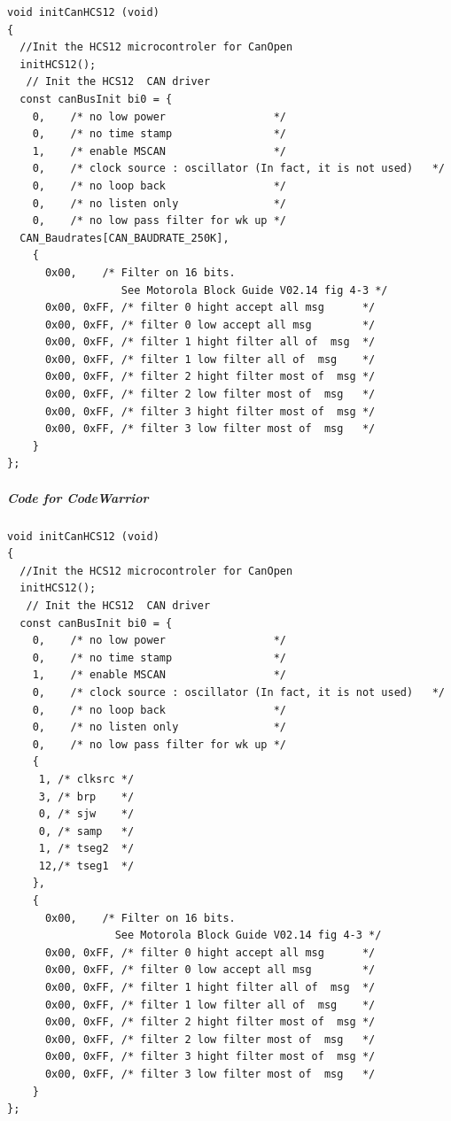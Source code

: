 \documentclass[12pt,english,a4paper]{book}
\begin{document}
\begin{verbatim}
void initCanHCS12 (void)
{  
  //Init the HCS12 microcontroler for CanOpen 
  initHCS12();
   // Init the HCS12  CAN driver
  const canBusInit bi0 = {
    0,    /* no low power                 */ 
    0,    /* no time stamp                */
    1,    /* enable MSCAN                 */
    0,    /* clock source : oscillator (In fact, it is not used)   */
    0,    /* no loop back                 */
    0,    /* no listen only               */
    0,    /* no low pass filter for wk up */
  CAN_Baudrates[CAN_BAUDRATE_250K],
    {
      0x00,    /* Filter on 16 bits.
                  See Motorola Block Guide V02.14 fig 4-3 */
      0x00, 0xFF, /* filter 0 hight accept all msg      */
      0x00, 0xFF, /* filter 0 low accept all msg        */
      0x00, 0xFF, /* filter 1 hight filter all of  msg  */
      0x00, 0xFF, /* filter 1 low filter all of  msg    */
      0x00, 0xFF, /* filter 2 hight filter most of  msg */
      0x00, 0xFF, /* filter 2 low filter most of  msg   */
      0x00, 0xFF, /* filter 3 hight filter most of  msg */
      0x00, 0xFF, /* filter 3 low filter most of  msg   */
    }
};
\end{verbatim}


\subparagraph{Code for CodeWarrior
}


\begin{verbatim}
void initCanHCS12 (void)
{  
  //Init the HCS12 microcontroler for CanOpen 
  initHCS12();
   // Init the HCS12  CAN driver
  const canBusInit bi0 = {
    0,    /* no low power                 */ 
    0,    /* no time stamp                */
    1,    /* enable MSCAN                 */
    0,    /* clock source : oscillator (In fact, it is not used)   */
    0,    /* no loop back                 */
    0,    /* no listen only               */
    0,    /* no low pass filter for wk up */
    {
     1, /* clksrc */
     3, /* brp    */
     0, /* sjw    */
     0, /* samp   */
     1, /* tseg2  */
     12,/* tseg1  */
    },
    {
      0x00,    /* Filter on 16 bits.
                 See Motorola Block Guide V02.14 fig 4-3 */
      0x00, 0xFF, /* filter 0 hight accept all msg      */
      0x00, 0xFF, /* filter 0 low accept all msg        */
      0x00, 0xFF, /* filter 1 hight filter all of  msg  */
      0x00, 0xFF, /* filter 1 low filter all of  msg    */
      0x00, 0xFF, /* filter 2 hight filter most of  msg */
      0x00, 0xFF, /* filter 2 low filter most of  msg   */
      0x00, 0xFF, /* filter 3 hight filter most of  msg */
      0x00, 0xFF, /* filter 3 low filter most of  msg   */
    }
};
\end{verbatim}
\end{document}
